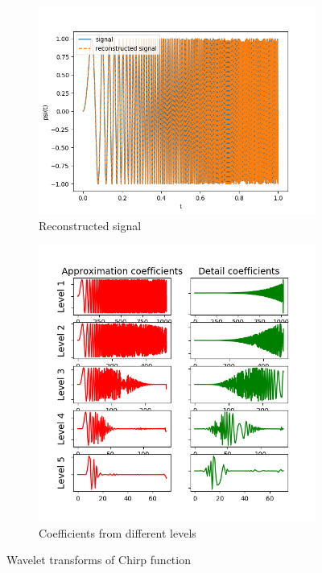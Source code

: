 \documentclass[12pt]{article}
\begin{document}
\begin{figure}[h]
	\centering
	\begin{subfigure}[h]{0.40\textwidth}
		\centering
		\includegraphics[width=\textwidth]{proofofconcept_reconst.png}
		\caption{Reconstructed signal}
	\end{subfigure}
	\begin{subfigure}[h]{0.40\textwidth}
		\centering
		\includegraphics[width=\textwidth]{proofofconcept_coeff.png}
		\caption{Coefficients from different levels}
	\end{subfigure}
	\caption{Wavelet transforms of Chirp function}
\end{figure}
\end{document}
